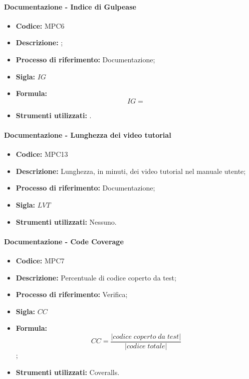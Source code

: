 \paragraph{Documentazione - Indice di Gulpease}
\begin{itemize}
    \item \textbf{Codice:} MPC6
    \item \textbf{Descrizione:} ;
    \item \textbf{Processo di riferimento:} Documentazione;
    \item \textbf{Sigla:} $IG$
    \item \textbf{Formula:}$$IG = {}$$
    \item \textbf{Strumenti utilizzati:} .
\end{itemize}

\paragraph{Documentazione - Lunghezza dei video tutorial}
\begin{itemize}
    \item \textbf{Codice:} MPC13
    \item \textbf{Descrizione:} Lunghezza, in minuti, dei video tutorial nel manuale utente;
    \item \textbf{Processo di riferimento:} Documentazione;
    \item \textbf{Sigla:} $LVT$
    \item \textbf{Strumenti utilizzati:} Nessuno.
\end{itemize}

\paragraph{Documentazione - Code Coverage}
\begin{itemize}
    \item \textbf{Codice:} MPC7
    \item \textbf{Descrizione:} Percentuale di codice coperto da test;
    \item \textbf{Processo di riferimento:} Verifica;
    \item \textbf{Sigla:} $CC$
    \item \textbf{Formula:} $$CC = \frac{|codice \; coperto \; da \; test|}{|codice \; totale|} $$;
    \item \textbf{Strumenti utilizzati:} Coveralls.
\end{itemize}

